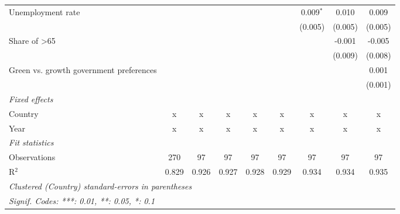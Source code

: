 \begin{table}[htbp]
\begin{tabular}{lcccccccc}
      Unemployment rate                           &         &         &             &             &         & 0.009$^{*}$ & 0.010   & 0.009\\   
                                                  &         &         &             &             &         & (0.005)     & (0.005) & (0.005)\\   
      Share of >65                                &         &         &             &             &         &             & -0.001  & -0.005\\   
                                                  &         &         &             &             &         &             & (0.009) & (0.008)\\   
      Green vs. growth government preferences     &         &         &             &             &         &             &         & 0.001\\   
                                                  &         &         &             &             &         &             &         & (0.001)\\   
      \emph{Fixed effects}\\
      Country                                     & x       & x       & x           & x           & x       & x           & x       & x\\  
      Year                                        & x       & x       & x           & x           & x       & x           & x       & x\\  
      \midrule \emph{Fit statistics}\\
      Observations                                & 270     & 97      & 97          & 97          & 97      & 97          & 97      & 97\\  
      R$^2$                                       & 0.829   & 0.926   & 0.927       & 0.928       & 0.929   & 0.934       & 0.934   & 0.935\\  
      \midrule
      \multicolumn{9}{l}{\emph{Clustered (Country) standard-errors in parentheses}}\\
      \multicolumn{9}{l}{\emph{Signif. Codes: ***: 0.01, **: 0.05, *: 0.1}}\\
   \end{tabular}
\end{table}


